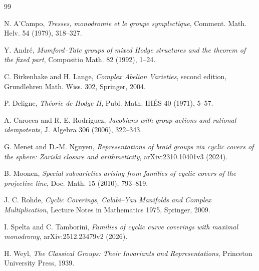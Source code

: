 \documentclass[11pt]{article}
\theoremstyle{definition}
\theoremstyle{remark}
\begin{document}
\begin{thebibliography}{99}

N. A'Campo,
\emph{Tresses, monodromie et le groupe symplectique},
Comment. Math. Helv. 54 (1979), 318--327.

Y. Andr\'e,
\emph{Mumford--Tate groups of mixed Hodge structures and the theorem of the fixed part},
Compositio Math. 82 (1992), 1--24.

C. Birkenhake and H. Lange,
\emph{Complex Abelian Varieties}, second edition,
Grundlehren Math. Wiss. 302, Springer, 2004.

P. Deligne,
\emph{Th\'eorie de Hodge II},
Publ. Math. IH\'ES 40 (1971), 5--57.

A. Carocca and R. E. Rodr\'iguez,
\emph{Jacobians with group actions and rational idempotents},
J. Algebra 306 (2006), 322--343.

G. Menet and D.-M. Nguyen,
\emph{Representations of braid groups via cyclic covers of the sphere: Zariski closure and arithmeticity},
arXiv:2310.10401v3 (2024).

B. Moonen,
\emph{Special subvarieties arising from families of cyclic covers of the projective line},
Doc. Math. 15 (2010), 793--819.

J. C. Rohde,
\emph{Cyclic Coverings, Calabi--Yau Manifolds and Complex Multiplication},
Lecture Notes in Mathematics 1975, Springer, 2009.

I. Spelta and C. Tamborini,
\emph{Families of cyclic curve coverings with maximal monodromy},
arXiv:2512.23479v2 (2026).

H. Weyl,
\emph{The Classical Groups: Their Invariants and Representations},
Princeton University Press, 1939.

\end{thebibliography}
\end{document}
